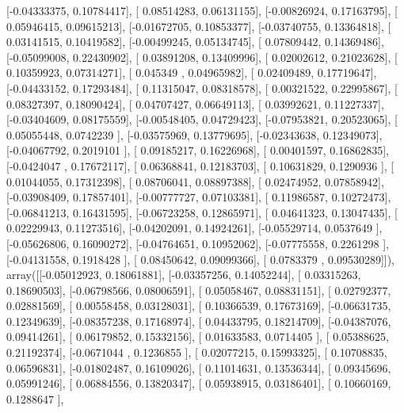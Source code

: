 \documentclass{article}
\begin{document}
       [-0.04333375,  0.10784417],
       [ 0.08514283,  0.06131155],
       [-0.00826924,  0.17163795],
       [ 0.05946415,  0.09615213],
       [-0.01672705,  0.10853377],
       [-0.03740755,  0.13364818],
       [ 0.03141515,  0.10419582],
       [-0.00499245,  0.05134745],
       [ 0.07809442,  0.14369486],
       [-0.05099008,  0.22430902],
       [ 0.03891208,  0.13409996],
       [ 0.02002612,  0.21023628],
       [ 0.10359923,  0.07314271],
       [ 0.045349  ,  0.04965982],
       [ 0.02409489,  0.17719647],
       [-0.04433152,  0.17293484],
       [ 0.11315047,  0.08318578],
       [ 0.00321522,  0.22995867],
       [ 0.08327397,  0.18090424],
       [ 0.04707427,  0.06649113],
       [ 0.03992621,  0.11227337],
       [-0.03404609,  0.08175559],
       [-0.00548405,  0.04729423],
       [-0.07953821,  0.20523065],
       [ 0.05055448,  0.0742239 ],
       [-0.03575969,  0.13779695],
       [-0.02343638,  0.12349073],
       [-0.04067792,  0.2019101 ],
       [ 0.09185217,  0.16226968],
       [ 0.00401597,  0.16862835],
       [-0.0424047 ,  0.17672117],
       [ 0.06368841,  0.12183703],
       [ 0.10631829,  0.1290936 ],
       [ 0.01044055,  0.17312398],
       [ 0.08706041,  0.08897388],
       [ 0.02474952,  0.07858942],
       [-0.03908409,  0.17857401],
       [-0.00777727,  0.07103381],
       [ 0.11986587,  0.10272473],
       [-0.06841213,  0.16431595],
       [-0.06723258,  0.12865971],
       [ 0.04641323,  0.13047435],
       [ 0.02229943,  0.11273516],
       [-0.04202091,  0.14924261],
       [-0.05529714,  0.0537649 ],
       [-0.05626806,  0.16090272],
       [-0.04764651,  0.10952062],
       [-0.07775558,  0.2261298 ],
       [-0.04131558,  0.1918428 ],
       [ 0.08450642,  0.09099366],
       [ 0.0783379 ,  0.09530289]]), array([[-0.05012923,  0.18061881],
       [-0.03357256,  0.14052244],
       [ 0.03315263,  0.18690503],
       [-0.06798566,  0.08006591],
       [ 0.05058467,  0.08831151],
       [ 0.02792377,  0.02881569],
       [ 0.00558458,  0.03128031],
       [ 0.10366539,  0.17673169],
       [-0.06631735,  0.12349639],
       [-0.08357238,  0.17168974],
       [ 0.04433795,  0.18214709],
       [-0.04387076,  0.09414261],
       [ 0.06179852,  0.15332156],
       [ 0.01633583,  0.0714405 ],
       [ 0.05388625,  0.21192374],
       [-0.0671044 ,  0.1236855 ],
       [ 0.02077215,  0.15993325],
       [ 0.10708835,  0.06596831],
       [-0.01802487,  0.16109026],
       [ 0.11014631,  0.13536344],
       [ 0.09345696,  0.05991246],
       [ 0.06884556,  0.13820347],
       [ 0.05938915,  0.03186401],
       [ 0.10660169,  0.1288647 ],
\end{document}
